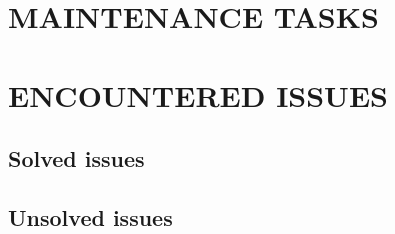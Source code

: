 \chapter{MAINTENANCE TASKS}
\label{chap:maintenance}

\chapter{ENCOUNTERED ISSUES}
\label{chap:issues}

\section{Solved issues}
\section{Unsolved issues}
